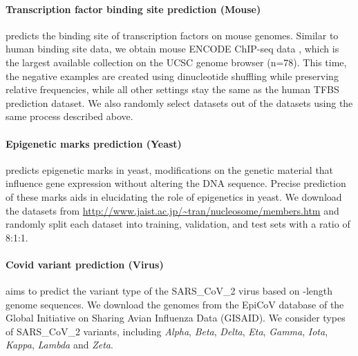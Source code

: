 \documentclass{article}
\begin{document}
\paragraph{Transcription factor binding site prediction (Mouse)} predicts the binding site of transcription factors on mouse genomes. Similar to human binding site data, we obtain mouse ENCODE ChIP-seq data \citep{mouse}, which is the largest available collection on the UCSC genome browser (n=78). This time, the negative examples are created using dinucleotide shuffling while preserving relative frequencies, while all other settings stay the same as the human TFBS prediction dataset. We also randomly select  datasets out of the  datasets using the same process described above.


\paragraph{Epigenetic marks prediction (Yeast)}  predicts epigenetic marks in yeast, modifications on the genetic material that influence gene expression without altering the DNA sequence. Precise prediction of these marks aids in elucidating the role of epigenetics in yeast. We download the  datasets from \url{http://www.jaist.ac.jp/~tran/nucleosome/members.htm} and randomly split each dataset into training, validation, and test sets with a ratio of 8:1:1.


\paragraph{Covid variant prediction (Virus)} aims to predict the variant type of the SARS\_CoV\_2 virus based on -length genome sequences. We download the genomes from the EpiCoV database \citep{covid} of the Global Initiative on Sharing Avian Influenza Data (GISAID). We consider  types of SARS\_CoV\_2 variants, including \textit{Alpha}, \textit{Beta}, \textit{Delta}, \textit{Eta}, \textit{Gamma}, \textit{Iota}, \textit{Kappa}, \textit{Lambda} and \textit{Zeta}.
\end{document}
